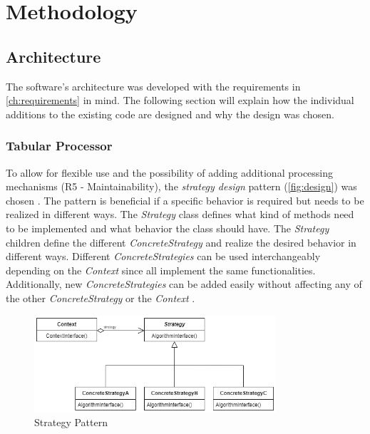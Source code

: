 \chapter{Methodology}
\label{ch:methodology}


\section{Architecture}
\label{ch:architecture}

The software's architecture was developed with the requirements in \autoref{ch:requirements} in mind.
The following section will explain how the individual additions to the existing code are designed and why the design was chosen.


\subsection{Tabular Processor}
\label{ch:architecture-tabularProcessor}

To allow for flexible use and the possibility of adding additional processing mechanisms (R5 - Maintainability), the \textit{strategy design} pattern (\autoref{fig:design}) was chosen \cite{gamma1994design}.
The pattern is beneficial if a specific behavior is required but needs to be realized in different ways.
The \textit{Strategy} class defines what kind of methods need to be implemented and what behavior the class should have.
The \textit{Strategy} children define the different \textit{ConcreteStrategy} and realize the desired behavior in different ways.
Different \textit{ConcreteStrategies} can be used interchangeably depending on the \textit{Context} since all implement the same functionalities.
Additionally, new \textit{ConcreteStrategies} can be added easily without affecting any of the other \textit{ConcreteStrategy} or the \textit{Context} \cite{gamma1994design}.

\begin{figure}[h]
	\centering
	\includegraphics[width=0.8\textwidth]{images/strategy.png}
	\caption{Strategy Pattern \cite[p. 316]{gamma1994design}}
	\label{fig:design}
\end{figure}

